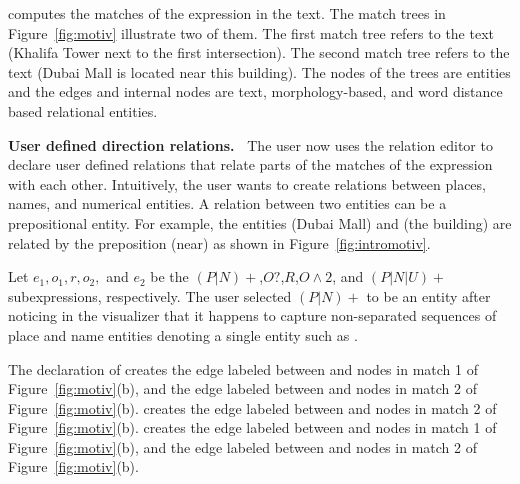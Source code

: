 \framework computes the matches of the expression in the text. 
The match trees in Figure~\ref{fig:motiv} illustrate two of them. 
The first match tree refers to the text 
(Khalifa Tower next to 
the first intersection). 
The second match tree refers to the text 
(Dubai Mall is located near this building).
The nodes of the trees are entities and the edges and internal nodes are text, 
morphology-based, 
and word distance based relational entities. 

{\bf User defined direction relations.~} 
The user now uses the relation editor to declare user defined relations that relate 
parts of the matches of the expression with each other. 
Intuitively, 
the user wants to create relations between places, names, and numerical entities. 
A relation between two entities can be a prepositional entity.
For example, the entities (Dubai Mall) and (the building) are 
related by the preposition (near) as shown in Figure~\ref{fig:intromotiv}.

Let $e_1,o_1,r,o_2,$ and $e_2$ be the 
$(P|N)+$,$O?$,$R$,$O\wedge 2$, and $(P|N|U)+$ subexpressions, respectively.
The user selected $(P|N)+$ to be an entity after noticing in the visualizer  
that it happens to capture 
non-separated sequences of place and name entities denoting a single 
entity such as .

The declaration of  creates the 
edge labeled  between  and 
 nodes in match 1 of Figure~\ref{fig:motiv}(b), and the 
edge labeled  between  and  nodes in 
match 2 of Figure~\ref{fig:motiv}(b). 
%
 creates the edge labeled  
between  and  nodes in match 2 of Figure~\ref{fig:motiv}(b). 
%
 creates the edge labeled  
between  and  nodes in 
match 1 of Figure~\ref{fig:motiv}(b), and the 
edge labeled  between  and  
nodes in match 2 of Figure~\ref{fig:motiv}(b). 


